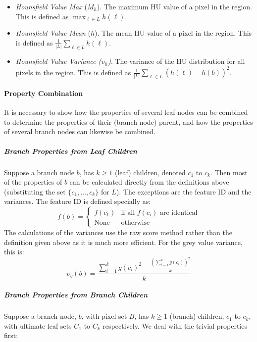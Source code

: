 \begin{itemize}
\item \emph{Hounsfield Value Max} ($M_h$). The maximum HU value of a pixel in the region. This is defined as $\displaystyle \max_{\ell \in L} h(\ell)$.

\item \emph{Hounsfield Value Mean} ($\bar{h}$). The mean HU value of a pixel in the region. This is defined as $\displaystyle \frac{1}{|L|} \sum_{\ell \in L} h(\ell)$.

\item \emph{Hounsfield Value Variance ($\upsilon_h$)}. The variance of the HU distribution for all pixels in the region. This is defined as $\displaystyle \frac{1}{|L|} \sum_{\ell \in L} (h(\ell) - \bar{h}(b))^2$.

\end{itemize}

\paragraph{Property Combination}

It is necessary to show how the properties of several leaf nodes can be combined to determine the properties of their (branch node) parent, and how the properties of several branch nodes can likewise be combined.

\subparagraph{Branch Properties from Leaf Children}

Suppose a branch node $b$, has $k \ge 1$ (leaf) children, denoted $c_1$ to $c_k$. Then most of the properties of $b$ can be calculated directly from the definitions above (substituting the set $\{c_1,\ldots,c_k\}$ for $L$). The exceptions are the feature ID and the variances. The feature ID is defined specially as:
%
\[
f(b) = \left\{
\begin{array}{ll}
f(c_1) & \mbox{if all }f(c_i)\mbox{ are identical} \\
\mbox{None} & \mbox{otherwise}
\end{array}
\right.
\]
%
The calculations of the variances use the raw score method rather than the definition given above as it is much more efficient. For the grey value variance, this is:
%
\[
\upsilon_g(b) = \frac{\sum_{i=1}^k g(c_i)^2 - \frac{(\sum_{i=1}^k g(c_i))^2}{k}}{k}
\]

\subparagraph{Branch Properties from Branch Children}

Suppose a branch node, $b$, with pixel set $B$, has $k \ge 1$ (branch) children, $c_1$ to $c_k$, with ultimate leaf sets $C_1$ to $C_k$ respectively. We deal with the trivial properties first:

